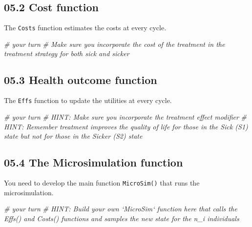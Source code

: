 \documentclass[
]{article}
\newenvironment{Shaded}{\begin{snugshade}}{\end{snugshade}}
\newcommand{\CommentTok}[1]{\textcolor[rgb]{0.56,0.35,0.01}{\textit{#1}}}
\begin{document}
\hypertarget{cost-function}{%
\subsection{05.2 Cost function}\label{cost-function}}

The \texttt{Costs} function estimates the costs at every cycle.

\begin{Shaded}
\begin{Highlighting}[]
\CommentTok{# your turn}
\CommentTok{# Make sure you incorporate the cost of the treatment in the treatment strategy for both sick and sicker}
\end{Highlighting}
\end{Shaded}

\hypertarget{health-outcome-function}{%
\subsection{05.3 Health outcome
function}\label{health-outcome-function}}

The \texttt{Effs} function to update the utilities at every cycle.

\begin{Shaded}
\begin{Highlighting}[]
\CommentTok{# your turn}
\CommentTok{# HINT: Make sure you incorporate the treatment effect modifier }
\CommentTok{# HINT: Remember treatment improves the quality of life for those in the Sick (S1) state but not for those in the Sicker (S2) state}
\end{Highlighting}
\end{Shaded}

\hypertarget{the-microsimulation-function}{%
\subsection{05.4 The Microsimulation
function}\label{the-microsimulation-function}}

You need to develop the main function \texttt{MicroSim()} that runs the
microsimulation.

\begin{Shaded}
\begin{Highlighting}[]
\CommentTok{# your turn}
\CommentTok{# HINT: Build your own `MicroSim` function here that calls the Effs() and Costs() functions and samples the new state for the n_i individuals }
\end{Highlighting}
\end{Shaded}
\end{document}
